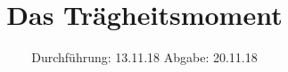

\subject{V101}
\title{Das Trägheitsmoment}
\date{%
  Durchführung: 13.11.18
  \hspace{3em}
  Abgabe: 20.11.18
}



\maketitle
\thispagestyle{empty}
\tableofcontents
\newpage







\printbibliography{}


